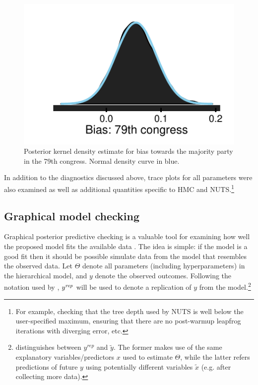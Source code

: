 \begin{figure}[h]
\centering
	\includegraphics[scale=0.75]{sections/figs/example_posterior}
\caption{Posterior kernel density estimate for bias towards the majority party in the 79th congress. Normal density curve in blue.}
\label{fig:ck_example_posterior}
\end{figure}


%
%
%

In addition to the diagnostics discussed above, trace plots for all parameters were also examined as well as additional quantities specific to HMC and NUTS.\footnote{For example, checking that the tree depth used by NUTS is well below the user-specified maximum, ensuring that there are no post-warmup leapfrog iterations with diverging error, etc.}




\subsection{Graphical model checking}
\label{subsection_model_checking}

Graphical posterior predictive checking is a valuable tool for examining how well the proposed model fits the available data . The idea is simple: if the model is a good fit then it should be possible simulate data from the model that resembles the observed data. Let $\Theta$ denote all parameters (including hyperparameters) in the hierarchical model, and $y$ denote the observed outcomes. Following the notation used by , $y^{\it rep}$ will be used to denote a replication of $y$ from the model.\footnote{ distinguishes between $y^{rep}$ and $\tilde{y}$. The former makes use of the same explanatory variables/predictors $x$ used to estimate $\Theta$, while the latter refers predictions of future $y$ using potentially different variables $\tilde{x}$ (e.g. after collecting more data).}

